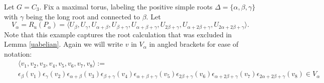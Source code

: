 \begin{example} Let $G=C_3$. Fix a maximal torus, labeling the positive simple roots $\Delta=\{\alpha, \beta, \gamma\}$ with $\gamma$ being the long root and connected to $\beta$. Let 
	\begin{displaymath}
		V_\alpha = R_u(P_\alpha) = \langle U_\beta, U_\gamma, U_{\alpha+\beta}, U_{\beta+\gamma}, U_{\alpha+\beta+\gamma}, U_{2\beta+\gamma}, U_{\alpha+2\beta+\gamma}, U_{2\alpha+2\beta+\gamma}\rangle.
	\end{displaymath}
	Note that this example captures the root calculation that was excluded in Lemma \ref{uabelian}.
	Again we will write $v$ in $V_\alpha$ in angled brackets for ease of notation:
	\begin{eqnarray*}
		&&\langle 
		v_1,
		v_2,
		v_3,
		v_4,
		v_5,
		v_6,
		v_7,
		v_8
		\rangle :=\\
		&&\epsilon_{\beta}(v_1)
		\epsilon_{\gamma}(v_2)
		\epsilon_{\alpha+\beta}(v_3)
		\epsilon_{\beta+\gamma}(v_4)
		\epsilon_{\alpha+\beta+\gamma}(v_5)
		\epsilon_{2\beta+\gamma}(v_6)
		\epsilon_{\alpha+2\beta+\gamma}(v_7)
		\epsilon_{2\alpha+2\beta+\gamma}(v_8) \in V_\alpha
	\end{eqnarray*}
		

\end{example}
